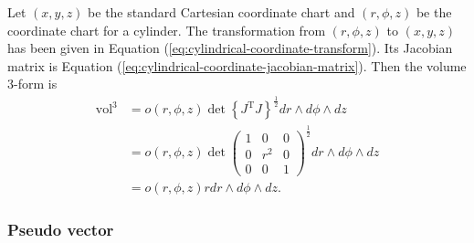 \documentclass[11pt, a4paper]{book}
\begin{document}
\begin{Example}
  Let $(x,y,z)$ be the standard Cartesian coordinate chart and $(r, \phi, z)$ be the
  coordinate chart for a cylinder. The transformation from $(r, \phi, z)$ to $(x,y,z)$ has
  been given in Equation (\ref{eq:cylindrical-coordinate-transform}). Its Jacobian matrix
  is Equation (\ref{eq:cylindrical-coordinate-jacobian-matrix}). Then the volume 3-form is
  \begin{equation}
    \begin{aligned}
      \mathrm{vol}^3 &= o(r,\phi,z) \det \left\{ J^{\mathrm{T}} J
      \right\}^{\frac{1}{2}} dr \wedge d\phi \wedge dz \\
      &= o(r,\phi,z) \det \begin{pmatrix}
        1 & 0 & 0 \\
        0 & r^2 & 0 \\
        0 & 0 & 1
      \end{pmatrix}^{\frac{1}{2}} dr \wedge d\phi \wedge dz \\
      & = o(r,\phi,z) r dr \wedge d\phi \wedge dz.
    \end{aligned}
  \end{equation}
\end{Example}

\subsubsection{Pseudo vector}
\label{sec:pseudo-vector}
\end{document}
